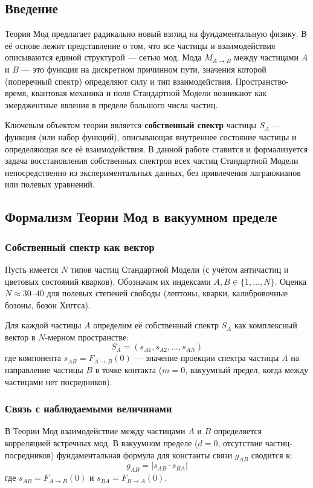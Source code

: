 \documentclass[12pt,a4paper]{article}
\begin{document}
\subsection{Введение}
Теория Мод предлагает радикально новый взгляд на фундаментальную физику. В её основе лежит представление о том, что все частицы и взаимодействия описываются единой структурой --- сетью мод. Мода $M_{A \to B}$ между частицами $A$ и $B$ --- это функция на дискретном причинном пути, значения которой (поперечный спектр) определяют силу и тип взаимодействия. Пространство-время, квантовая механика и поля Стандартной Модели возникают как эмерджентные явления в пределе большого числа частиц.

Ключевым объектом теории является \textbf{собственный спектр} частицы $S_A$ --- функция (или набор функций), описывающая внутреннее состояние частицы и определяющая все её взаимодействия. В данной работе ставится и формализуется задача восстановления собственных спектров всех частиц Стандартной Модели непосредственно из экспериментальных данных, без привлечения лагранжианов или полевых уравнений.

\subsection{Формализм Теории Мод в вакуумном пределе}

\subsubsection{Собственный спектр как вектор}
Пусть имеется $N$ типов частиц Стандартной Модели (с учётом античастиц и цветовых состояний кварков). Обозначим их индексами $A, B \in \{1, \dots, N\}$. Оценка $N \approx 30$--$40$ для полевых степеней свободы (лептоны, кварки, калибровочные бозоны, бозон Хиггса).

Для каждой частицы $A$ определим её собственный спектр $S_A$ как комплексный вектор в $N$-мерном пространстве:
\begin{equation}
    S_A = (s_{A1}, s_{A2}, \dots, s_{AN})
\end{equation}
где компонента $s_{AB} = F_{A \to B}(0)$ --- значение проекции спектра частицы $A$ на направление частицы $B$ в точке контакта ($m = 0$, вакуумный предел, когда между частицами нет посредников).

\subsubsection{Связь с наблюдаемыми величинами}
В Теории Мод взаимодействие между частицами $A$ и $B$ определяется корреляцией встречных мод. В вакуумном пределе ($d = 0$, отсутствие частиц-посредников) фундаментальная формула для константы связи $g_{AB}$ сводится к:
\begin{equation}
    g_{AB} = |s_{AB} \cdot s_{BA}|
\end{equation}
где $s_{AB} = F_{A \to B}(0)$ и $s_{BA} = F_{B \to A}(0)$.
\end{document}
